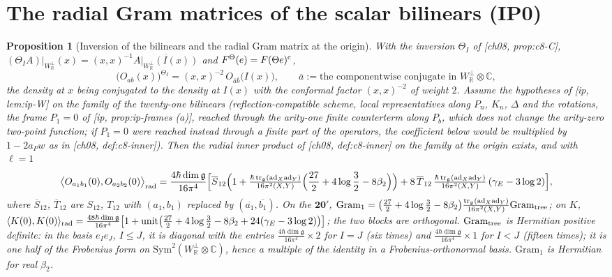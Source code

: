 \documentclass[11pt]{article}
\theoremstyle{plain}
\newtheorem{proposition}[theorem]{Proposition}
\theoremstyle{definition}
\numberwithin{equation}{section}
\newcommand{\unit}{\tfrac{\hbar\operatorname{tr}_{\mathfrak g}(\mathrm{ad}_X\mathrm{ad}_Y)}{16\pi^2(X,Y)}}
\newcommand{\Wp}{W_{\mathbb R}^\perp}
\newcommand{\Gt}{\mathrm{Gram}_{\rm tree}}
\newcommand{\Go}{\mathrm{Gram}_1}
\begin{document}
\section{The radial Gram matrices of the scalar bilinears (IP0)}

\begin{proposition}[Inversion of the bilinears and the radial Gram matrix at the origin]
\label{prop:ip0}
With the inversion $\Theta_I$ of [ch08, prop:c8-C], $(\Theta_IA)|_{\Wp}(x)=(x,x)^{-1}\overline{A|_{\Wp}(I(x))}$ and $F^{\Theta}(e)=F(\Theta e)^{\rm c}$,
\[
\big(O_{ab}(x)\big)^{\Theta_I}=(x,x)^{-2}\,O_{\bar a\bar b}\big(I(x)\big),\qquad \overline{a}:=\text{the componentwise conjugate in }\Wp\otimes\mathbb C ,
\]
the density at $x$ being conjugated to the density at $I(x)$ with the conformal factor $(x,x)^{-2}$ of weight $2$. Assume the hypotheses of [ip, lem:ip-W] on the family of the twenty-one bilinears (reflection-compatible scheme, local representatives along $P_n$, $K_n$, $\Delta$ and the rotations, the frame $P_1=0$ of [ip, prop:ip-frames (a)], reached through the arity-one finite counterterm along $P_b$, which does not change the arity-zero two-point function; if $P_1=0$ were reached instead through a finite part of the operators, the coefficient below would be multiplied by $1-2a_Pw$ as in [ch08, def:c8-inner]). Then the radial inner product of [ch08, def:c8-inner] on the family at the origin exists, and with $\ell=1$
\begin{equation}
\big\langle O_{a_1b_1}(0),O_{a_2b_2}(0)\big\rangle_{\rm rad}=\frac{4\hbar\dim\mathfrak g}{16\pi^4}\Big[\overline S_{12}\Big(1+\unit\Big(\frac{27}2+4\log\frac32-8\beta_2\Big)\Big)+8\,\overline T_{12}\,\unit\,(\gamma_E-3\log2)\Big],
\label{eq:gram}
\end{equation}
where $\overline S_{12}$, $\overline T_{12}$ are $S_{12}$, $T_{12}$ with $(a_1,b_1)$ replaced by $(\overline{a_1},\overline{b_1})$. On the $\mathbf{20'}$, $\Go=\big(\tfrac{27}2+4\log\tfrac32-8\beta_2\big)\frac{\operatorname{tr}_{\mathfrak g}(\mathrm{ad}_X\mathrm{ad}_Y)}{16\pi^2(X,Y)}\Gt$; on $K$, $\langle K(0),K(0)\rangle_{\rm rad}=\frac{48\hbar\dim\mathfrak g}{16\pi^4}\big[1+\mathrm{unit}\big(\tfrac{27}2+4\log\tfrac32-8\beta_2+24(\gamma_E-3\log2)\big)\big]$; the two blocks are orthogonal. $\Gt$ is Hermitian positive definite: in the basis $e_Ie_J$, $I\le J$, it is diagonal with the entries $\frac{4\hbar\dim\mathfrak g}{16\pi^4}\times2$ for $I=J$ (six times) and $\frac{4\hbar\dim\mathfrak g}{16\pi^4}\times1$ for $I<J$ (fifteen times); it is one half of the Frobenius form on $\mathrm{Sym}^2(\Wp\otimes\mathbb C)$, hence a multiple of the identity in a Frobenius-orthonormal basis. $\Go$ is Hermitian for real $\beta_2$.
\end{proposition}
\end{document}

